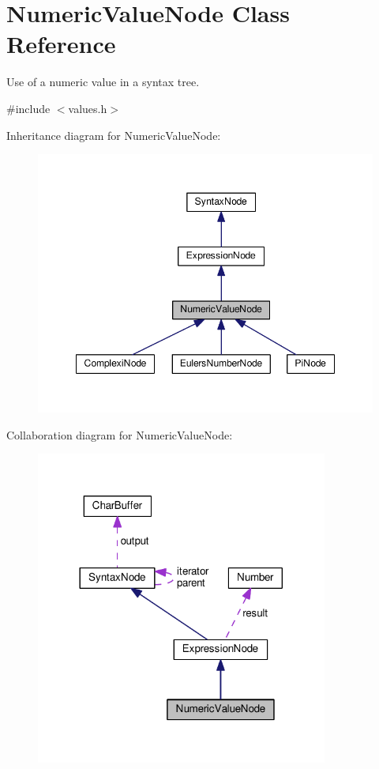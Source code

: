 \hypertarget{classNumericValueNode}{}\section{Numeric\+Value\+Node Class Reference}
\label{classNumericValueNode}


Use of a numeric value in a syntax tree.  




{\ttfamily \#include $<$values.\+h$>$}



Inheritance diagram for Numeric\+Value\+Node\+:\nopagebreak
\begin{figure}[H]
\begin{center}
\leavevmode
\includegraphics[width=348pt]{classNumericValueNode__inherit__graph}
\end{center}
\end{figure}


Collaboration diagram for Numeric\+Value\+Node\+:\nopagebreak
\begin{figure}[H]
\begin{center}
\leavevmode
\includegraphics[width=272pt]{classNumericValueNode__coll__graph}
\end{center}
\end{figure}
